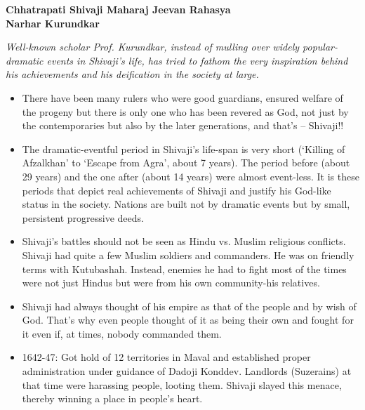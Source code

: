 \begin{center}
     \Large{\textbf{Chhatrapati Shivaji Maharaj Jeevan Rahasya \\ Narhar Kurundkar }}  %
\end{center}

{\em Well-known scholar Prof. Kurundkar, instead of mulling over widely popular-dramatic events in Shivaji’s life, has tried to fathom the very inspiration behind his achievements and his deification in the society at large.}

\bigskip

\begin{itemize}

\item There have been many rulers who were good guardians,  ensured welfare of the progeny but there is only one who has been revered as God,  not just by the contemporaries but also by the later generations, and that’s – Shivaji!!

\item The dramatic-eventful period in Shivaji’s life-span is very short (‘Killing of Afzalkhan’ to ‘Escape from Agra’, about 7 years). The period before (about 29 years) and the one after (about 14 years) were almost event-less. It is these periods that depict real achievements of Shivaji and justify his God-like status in the society. Nations are built not by dramatic events but by small, persistent progressive deeds.

\item Shivaji’s battles should not be seen as Hindu vs. Muslim religious conflicts. Shivaji had quite a few Muslim soldiers and commanders. He was on friendly terms with Kutubashah. Instead, enemies he had to fight most of the times were not just Hindus but were from his own community-his relatives. 

\item Shivaji had always thought of his empire as that of the people and by wish of God. That’s why even people thought of it as being their own and fought for it even if, at times, nobody commanded them.

\item 1642-47: Got hold of 12 territories in Maval and established proper administration under guidance of Dadoji Konddev. Landlords (Suzerains) at that time were harassing people, looting them. Shivaji slayed this menace, thereby winning a place in people’s heart.


\end{itemize}

